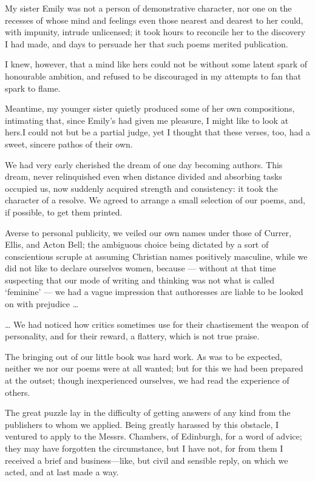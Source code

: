 {My sister Emily was not a person of demonstrative character, nor one on the recesses of whose mind and feelings even those nearest and dearest to her could, with impunity, intrude unlicensed; it took hours to reconcile her to the discovery I had made, and days to persuade her that such poems merited publication.

I knew, however, that a mind like hers could not be without some latent spark of honourable ambition, and refused to be discouraged in my attempts to fan that spark to flame.

Meantime, my younger sister quietly produced some of her own compositions, intimating that, since Emily’s had given me pleasure, I might like to look at hers.I could not but be a partial judge, yet I thought that these verses, too, had a sweet, sincere pathos of their own.

We had very early cherished the dream of one day becoming authors. This dream, never relinquished even when distance divided and absorbing tasks occupied us, now suddenly acquired strength and consistency: it took the character of a resolve. We agreed to arrange a small selection of our poems, and, if possible, to get them printed.

Averse to personal publicity, we veiled our own names under those of Currer, Ellis, and Acton Bell; the ambiguous choice being dictated by a sort of conscientious scruple at assuming Christian names positively masculine, while we did not like to declare ourselves women, because — without at that time suspecting that our mode of writing and thinking was not what is called ‘feminine’ — we had a vague impression that authoresses are liable to be looked on with prejudice …

… We had noticed how critics sometimes use for their chastisement the weapon of personality, and for their reward, a flattery, which is not true praise.

The bringing out of our little book was hard work. As was to be expected, neither we nor our poems were at all wanted; but for this we had been prepared at the outset; though inexperienced ourselves, we had read the experience of others.

The great puzzle lay in the difficulty of getting answers of any kind from the publishers to whom we applied. Being greatly harassed by this obstacle, I ventured to apply to the Messrs. Chambers, of Edinburgh, for a word of advice; they may have forgotten the circumstance, but I have not, for from them I received a brief and business—like, but civil and sensible reply, on which we acted, and at last made a way.

}

